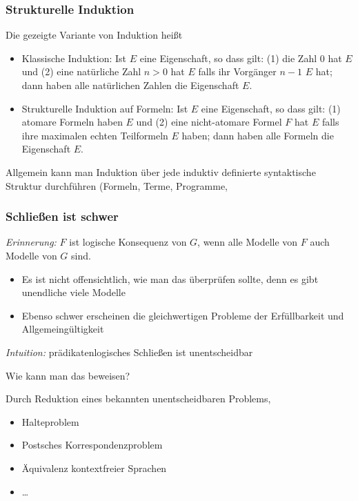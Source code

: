 \documentclass[onlymath]{beamer}
\begin{document}
\begin{frame}\frametitle{Strukturelle Induktion}

Die gezeigte Variante von Induktion heißt 
\begin{itemize}
\item \alert{Klassische Induktion:} Ist $E$ eine Eigenschaft, so dass gilt:
(1) die Zahl $0$ hat $E$ und (2) eine natürliche Zahl $n>0$ hat $E$ falls ihr Vorgänger $n-1$ $E$ hat;
dann haben alle natürlichen Zahlen die Eigenschaft $E$.
\item \alert{Strukturelle Induktion auf Formeln:} Ist $E$ eine Eigenschaft, so dass gilt:
(1) atomare Formeln haben $E$ und (2) eine nicht-atomare Formel $F$ hat $E$ falls ihre maximalen echten Teilformeln $E$ haben;
dann haben alle Formeln die Eigenschaft $E$.
\end{itemize}
Allgemein kann man Induktion über jede induktiv definierte syntaktische Struktur durchführen (Formeln, Terme, Programme, \ghost{\ldots)}\medskip\pause


\end{frame}


\begin{frame}\frametitle{Schließen ist schwer}

\emph{Erinnerung:} $F$ ist logische Konsequenz von $G$, wenn alle Modelle von $F$ auch Modelle von $G$ sind.
\begin{itemize}
\item Es ist nicht offensichtlich, wie man das überprüfen sollte, denn es gibt unendliche viele Modelle
\item Ebenso schwer erscheinen die gleichwertigen Probleme der Erfüllbarkeit und Allgemeingültigkeit
\end{itemize}\pause
\emph{Intuition:} prädikatenlogisches Schließen ist unentscheidbar
\bigskip

\alert{Wie kann man das beweisen?}\pause\bigskip

Durch Reduktion eines bekannten unentscheidbaren Problems, 
\begin{itemize}
\item Halteproblem
\item Postsches Korrespondenzproblem
\item Äquivalenz kontextfreier Sprachen
\item \ldots
\end{itemize}

\end{frame}
\end{document}
